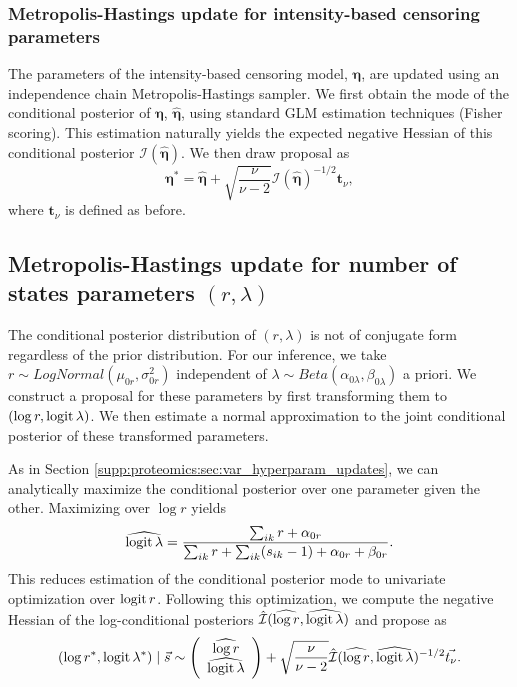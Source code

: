 \subsubsection{Metropolis-Hastings update for intensity-based censoring parameters}

The parameters of the intensity-based censoring model, $\bm \eta$,
are updated using an independence chain Metropolis-Hastings sampler.
%
We first obtain the mode of the conditional posterior of $\bm \eta$, $\hat{\bm \eta}$, using standard GLM estimation techniques (Fisher scoring).
This estimation naturally yields the expected negative Hessian of this conditional posterior $\mathcal{I}(\hat{\bm{\eta}})$.
We then draw proposal as
\begin{equation*}
\bm{\eta}^* = \hat{\bm{\eta}} + \sqrt{\frac{\nu}{\nu - 2}} \mathcal{I}(\hat{\bm{\eta}})^{-1/2} \bm{t}_\nu,
\end{equation*}
where $\bm{t}_\nu$ is defined as before.


\subsection{Metropolis-Hastings update for number of states parameters $(r, \lambda)$}
\label{supp:proteomics:sec:draw_number_of_states_hyperparameters}

The conditional posterior distribution of $(r, \lambda)$ is not of conjugate form regardless of the prior distribution.
For our inference, we take $r \sim LogNormal(\mu_{0r}, \sigma^2_{0r})$ independent of $\lambda \sim Beta(\alpha_{0\lambda}, \beta_{0\lambda})$ a priori.
We construct a proposal for these parameters by first transforming them to $(\log r, \operatorname{logit} \lambda)$.
We then estimate a normal approximation to the joint conditional posterior of these transformed parameters.

As in Section \ref{supp:proteomics:sec:var_hyperparam_updates}, we can analytically maximize  the conditional posterior over one parameter given the other.
Maximizing over $\log r$ yields
%
\begin{equation*}
\widehat{\operatorname{logit} \lambda} = \frac{\sum_{ik}r + \alpha_{0r}}{\sum_{ik}r+\sum_{ik}(s_{ik}-1) + \alpha_{0r} + \beta_{0r}} .
\end{equation*}
%
This reduces estimation of the conditional posterior mode to univariate optimization over $\operatorname{logit} r$.
Following this optimization, we compute the negative Hessian of the log-conditional posteriors $\hat{\mathcal{I}}(\widehat{\log r}, \widehat{\operatorname{logit} \lambda})$ and propose as
\begin{equation*}
(\log r^*, \operatorname{logit} \lambda^*) \mid \vec s \sim \left(\begin{array}{c}
\widehat{\log r} \\
\widehat{\operatorname{logit} \lambda}
\end{array}\right) +
\sqrt{\frac{\nu}{\nu - 2}} \hat{\mathcal{I}}(\widehat{\log r}, \widehat{\operatorname{logit} \lambda})^{-1/2} \vec{t_{\nu}} .
\end{equation*}


